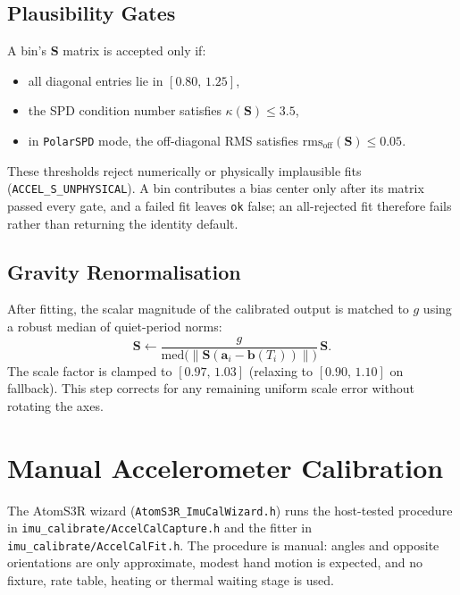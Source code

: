 \documentclass[conference]{IEEEtran}
\begin{document}
    \subsection{Plausibility Gates}

    A bin's $\mathbf{S}$ matrix is accepted only if:
    \begin{itemize}
        \item all diagonal entries lie in $[0.80,\,1.25]$,
        \item the SPD condition number satisfies $\kappa(\mathbf{S}) \le 3.5$,
        \item in \texttt{PolarSPD} mode, the off-diagonal RMS satisfies
        $\text{rms}_\text{off}(\mathbf{S}) \le 0.05$.
    \end{itemize}
    These thresholds reject numerically or physically implausible fits
    (\texttt{ACCEL\_S\_UNPHYSICAL}).
    A bin contributes a bias center only after its matrix passed every
    gate, and a failed fit leaves \texttt{ok} false; an all-rejected fit
    therefore fails rather than returning the identity default.

    \subsection{Gravity Renormalisation}

    After fitting, the scalar magnitude of the calibrated output is
    matched to $g$ using a robust median of quiet-period norms:
    \begin{equation}
        \mathbf{S} \leftarrow \frac{g}{\mathrm{med}\bigl(
        \|\mathbf{S}(\mathbf{a}_i - \mathbf{b}(T_i))\|\bigr)}\,\mathbf{S}.
    \end{equation}
    The scale factor is clamped to $[0.97,\,1.03]$ (relaxing to
    $[0.90,\,1.10]$ on fallback).
    This step corrects for any remaining uniform scale error without
    rotating the axes.

    \section{Manual Accelerometer Calibration}
    \label{sec:manual}

    The AtomS3R wizard (\texttt{AtomS3R\_ImuCalWizard.h}) runs the
    host-tested procedure in \texttt{imu\_calibrate/AccelCalCapture.h} and
    the fitter in \texttt{imu\_calibrate/AccelCalFit.h}.
    The procedure is manual: angles and opposite orientations are only
    approximate, modest hand motion is expected, and no fixture, rate table,
    heating or thermal waiting stage is used.
\end{document}
